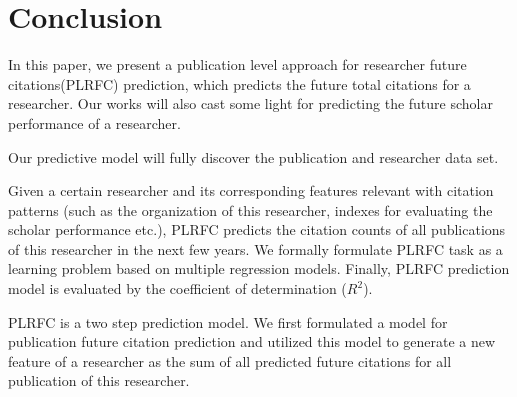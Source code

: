 \section{Conclusion}
In this paper, we present a publication level approach for researcher future citations(PLRFC) prediction, which predicts the future total citations for a researcher. 
Our works will also cast some light for predicting the future scholar performance of a researcher.

Our predictive model will fully discover the publication and researcher data set. 

Given a certain researcher and its corresponding features relevant with citation patterns (such as the organization of this researcher, indexes for evaluating the scholar performance etc.), PLRFC predicts the citation counts of all publications of this researcher in the next few years. We formally formulate PLRFC task as a learning problem based on multiple regression models.
Finally, PLRFC prediction model is evaluated by the coefficient of determination ($R^2$).

PLRFC is a two step prediction model. We first formulated a model for publication future citation prediction and utilized this model to generate a new feature of a researcher as the sum of all predicted future citations for all publication of this researcher.
